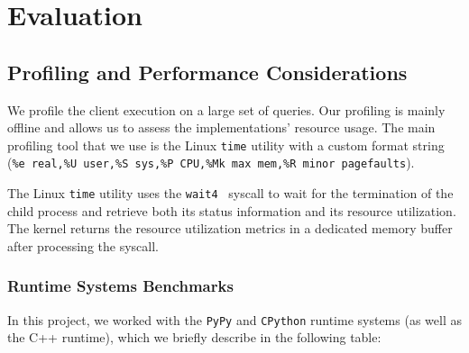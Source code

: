 
\section{Evaluation}
\label{sec:Eval}
\subsection{Profiling and Performance Considerations}
We profile the client execution on a large set of queries. Our profiling is mainly offline and allows us to assess the implementations' resource usage. The main profiling tool that we use is the Linux \texttt{time} utility with a custom format string (\texttt{\%e real,\%U user,\%S sys,\%P CPU,\%Mk max mem,\%R minor pagefaults}).

The Linux \texttt{time} utility uses the \texttt{wait4}~\cite{wait4} syscall to wait for the termination of the child process and retrieve both its status information and its resource utilization. The kernel returns the resource utilization metrics in a dedicated memory buffer after processing the syscall.

\subsubsection{Runtime Systems Benchmarks}
In this project, we worked with the \texttt{PyPy} and \texttt{CPython} runtime systems (as well as the C++ runtime), which we briefly describe in the following table:\\

\begin{table}[h!]
\centering
\caption{Comparison between PyPy and CPython}
\label{pypy_cpython_comparison}
\end{table}

